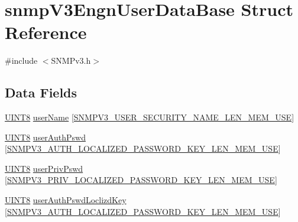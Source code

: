 \hypertarget{structsnmp_v3_engn_user_data_base}{}\section{snmp\+V3\+Engn\+User\+Data\+Base Struct Reference}
\label{structsnmp_v3_engn_user_data_base}


{\ttfamily \#include $<$S\+N\+M\+Pv3.\+h$>$}

\subsection*{Data Fields}
\begin{DoxyCompactItemize}
\item 
\hyperlink{_generic_type_defs_8h_ab27e9918b538ce9d8ca692479b375b6a}{U\+I\+N\+T8} \hyperlink{structsnmp_v3_engn_user_data_base_adf4ed71c2a36fa5084445908dbe8ca7c}{user\+Name} \mbox{[}\hyperlink{_s_n_m_pv3_8h_a6370ae1084295de8100f9a9e566345fc}{S\+N\+M\+P\+V3\+\_\+\+U\+S\+E\+R\+\_\+\+S\+E\+C\+U\+R\+I\+T\+Y\+\_\+\+N\+A\+M\+E\+\_\+\+L\+E\+N\+\_\+\+M\+E\+M\+\_\+\+U\+S\+E}\mbox{]}
\item 
\hyperlink{_generic_type_defs_8h_ab27e9918b538ce9d8ca692479b375b6a}{U\+I\+N\+T8} \hyperlink{structsnmp_v3_engn_user_data_base_a035aec89e2bb98c5983ce6205f3ceb86}{user\+Auth\+Pswd} \mbox{[}\hyperlink{_s_n_m_pv3_8h_a5f7d5a35f7e3aaac7fbd08558194400a}{S\+N\+M\+P\+V3\+\_\+\+A\+U\+T\+H\+\_\+\+L\+O\+C\+A\+L\+I\+Z\+E\+D\+\_\+\+P\+A\+S\+S\+W\+O\+R\+D\+\_\+\+K\+E\+Y\+\_\+\+L\+E\+N\+\_\+\+M\+E\+M\+\_\+\+U\+S\+E}\mbox{]}
\item 
\hyperlink{_generic_type_defs_8h_ab27e9918b538ce9d8ca692479b375b6a}{U\+I\+N\+T8} \hyperlink{structsnmp_v3_engn_user_data_base_a3dcd62798d6250610f27eea973055e9a}{user\+Priv\+Pswd} \mbox{[}\hyperlink{_s_n_m_pv3_8h_ac4f6c565b2b60abb96d01052e1bbb60e}{S\+N\+M\+P\+V3\+\_\+\+P\+R\+I\+V\+\_\+\+L\+O\+C\+A\+L\+I\+Z\+E\+D\+\_\+\+P\+A\+S\+S\+W\+O\+R\+D\+\_\+\+K\+E\+Y\+\_\+\+L\+E\+N\+\_\+\+M\+E\+M\+\_\+\+U\+S\+E}\mbox{]}
\item 
\hyperlink{_generic_type_defs_8h_ab27e9918b538ce9d8ca692479b375b6a}{U\+I\+N\+T8} \hyperlink{structsnmp_v3_engn_user_data_base_afb49130f507ef768cb1c91c83906c6e2}{user\+Auth\+Pswd\+Loclizd\+Key} \mbox{[}\hyperlink{_s_n_m_pv3_8h_a5f7d5a35f7e3aaac7fbd08558194400a}{S\+N\+M\+P\+V3\+\_\+\+A\+U\+T\+H\+\_\+\+L\+O\+C\+A\+L\+I\+Z\+E\+D\+\_\+\+P\+A\+S\+S\+W\+O\+R\+D\+\_\+\+K\+E\+Y\+\_\+\+L\+E\+N\+\_\+\+M\+E\+M\+\_\+\+U\+S\+E}\mbox{]}
\item 

\end{DoxyCompactItemize}
